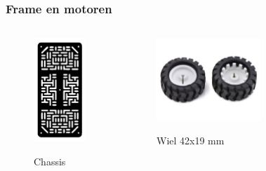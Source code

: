 \documentclass
   [kulak,aspectratio=169,<options>] %
   {kulakbeamer}
\begin{document}
\begin{frame}
	\frametitle{Frame en motoren} %
	
	\begin{columns}
		\begin{figure}
			\centering
			\includegraphics[width=.45\textwidth]{chassis}
			\caption{\scriptsize Chassis}\cite{RobotChassisRechthoekigZwart}
		\end{figure}
		\begin{figure}
			\centering
			\includegraphics[width=.7\textwidth]{wielen}
			\caption{\scriptsize Wiel 42x19 mm}\cite{Wiel42x19mm}
		\end{figure}
		\begin{figure}

\end{figure}
\end{columns}
\end{frame}
\end{document}
